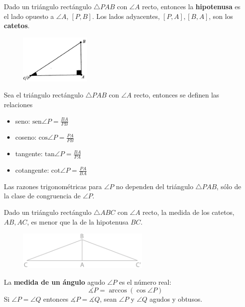  Dado un triángulo rectángulo $\triangle PAB$ con $\angle A$ recto, entonces la \textbf{hipotenusa} es el lado opuesto a $\angle A$, $[P,B]$. Los lados adyacentes, $[P,A],[B,A]$, son los \textbf{catetos}.
\begin{figure}[H]
	\centering
	\includegraphics[width=3.5cm]{figuras/5-7.png}
	\vspace{-1em}
\end{figure}
 Sea el triángulo rectángulo $\triangle PAB$ con $\angle A$ recto, entonces se definen las relaciones 
\begin{itemize}
	\item seno: $\text{sen}\angle P = \frac{BA}{PB}$
	\item coseno: $\text{cos}\angle P = \frac{PA}{PB}$
	\item tangente: $\text{tan}\angle P = \frac{BA}{PA}$
	\item cotangente: $\text{cot}\angle P = \frac{PA}{BA}$
\end{itemize}
 Las razones trigonométricas para $\angle P$ no dependen del triángulo $\triangle PAB$, sólo de la clase de congruencia de $\angle P$.

 Dado un triángulo rectángulo $\triangle ABC$ con $\angle A$ recto, la medida de los catetos, $AB,AC$, es menor que la de la hipotenusa $BC$.
\begin{figure}[H]
	\centering
	\includegraphics[width=6.5cm]{figuras/5-12.png}
	\vspace{-1em}
\end{figure}

 La \textbf{medida de un ángulo} agudo $\angle P$ es el número real:
$$\measuredangle P = \arccos(\cos \angle P)$$
 Si $\angle P = \angle Q$ entonces $\measuredangle P = \measuredangle Q$, sean $\angle P $ y $\angle Q$ agudos y obtusos.

